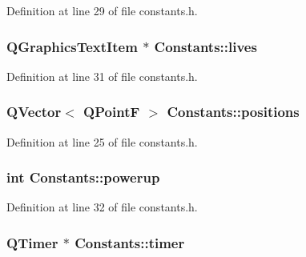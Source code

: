 Definition at line 29 of file constants.h.\hypertarget{class_constants_a27939bf9b68dbbc91f1337e1efebca31}{
\subsubsection[{lives}]{\setlength{\rightskip}{0pt plus 5cm}QGraphicsTextItem $\ast$ {\bf Constants::lives}}}
\label{class_constants_a27939bf9b68dbbc91f1337e1efebca31}


Definition at line 31 of file constants.h.\hypertarget{class_constants_a5dba875f5a45bc1db6ba815568d0992c}{
\subsubsection[{positions}]{\setlength{\rightskip}{0pt plus 5cm}QVector$<$ QPointF $>$ {\bf Constants::positions}}}
\label{class_constants_a5dba875f5a45bc1db6ba815568d0992c}


Definition at line 25 of file constants.h.\hypertarget{class_constants_a0ea79f17bacabd0d21cf906c0b9c4f74}{
\subsubsection[{powerup}]{\setlength{\rightskip}{0pt plus 5cm}int {\bf Constants::powerup}}}
\label{class_constants_a0ea79f17bacabd0d21cf906c0b9c4f74}


Definition at line 32 of file constants.h.\hypertarget{class_constants_a6923db6bb28609e4ba0a52977b8b9d12}{
\subsubsection[{timer}]{\setlength{\rightskip}{0pt plus 5cm}QTimer $\ast$ {\bf Constants::timer}}}
\label{class_constants_a6923db6bb28609e4ba0a52977b8b9d12}


